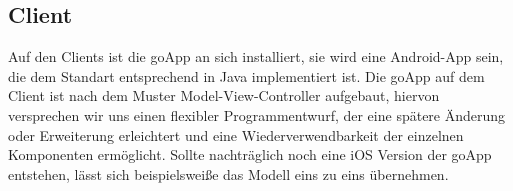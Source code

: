 \begin {center}
\end {center}


	\subsection{Client}
	Auf den Clients ist die goApp an sich installiert, sie wird eine Android-App sein, die dem Standart entsprechend in Java implementiert ist.
	Die goApp auf dem Client ist nach dem Muster Model-View-Controller aufgebaut, hiervon versprechen wir uns einen flexibler Programmentwurf, der eine spätere Änderung oder Erweiterung erleichtert und eine Wiederverwendbarkeit der einzelnen Komponenten ermöglicht.
Sollte nachträglich noch eine iOS Version der goApp entstehen, lässt sich beispielsweiße das Modell eins zu eins übernehmen.
	
